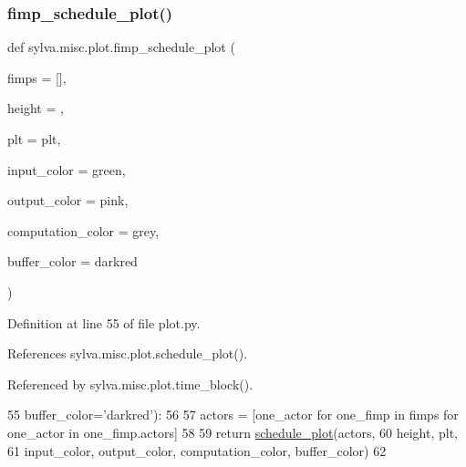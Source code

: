 \subsubsection{\texorpdfstring{fimp\+\_\+schedule\+\_\+plot()}{fimp\_schedule\_plot()}}
{\footnotesize\ttfamily def sylva.\+misc.\+plot.\+fimp\+\_\+schedule\+\_\+plot (\begin{DoxyParamCaption}\item[{}]{fimps = {\ttfamily \mbox{[}\mbox{]}},  }\item[{}]{height = {},  }\item[{}]{plt = {\ttfamily plt},  }\item[{}]{input\+\_\+color = {\ttfamily \textquotesingle{}green\textquotesingle{}},  }\item[{}]{output\+\_\+color = {\ttfamily \textquotesingle{}pink\textquotesingle{}},  }\item[{}]{computation\+\_\+color = {\ttfamily \textquotesingle{}grey\textquotesingle{}},  }\item[{}]{buffer\+\_\+color = {\ttfamily \textquotesingle{}darkred\textquotesingle{}} }\end{DoxyParamCaption})}



Definition at line 55 of file plot.\+py.



References sylva.\+misc.\+plot.\+schedule\+\_\+plot().



Referenced by sylva.\+misc.\+plot.\+time\+\_\+block().


\begin{DoxyCode}
55                            buffer\_color=\textcolor{stringliteral}{'darkred'}):
56 
57         actors = [one\_actor \textcolor{keywordflow}{for} one\_fimp \textcolor{keywordflow}{in} fimps \textcolor{keywordflow}{for} one\_actor \textcolor{keywordflow}{in} one\_fimp.actors]
58 
59         \textcolor{keywordflow}{return} \hyperlink{namespacesylva_1_1misc_1_1plot_a2937dd66c98822d9914353fc15105e14}{schedule\_plot}(actors,
60                              height, plt,
61                              input\_color, output\_color, computation\_color, buffer\_color)
62 
\end{DoxyCode}
\mbox{\label{namespacesylva_1_1misc_1_1plot_a2937dd66c98822d9914353fc15105e14}} 
